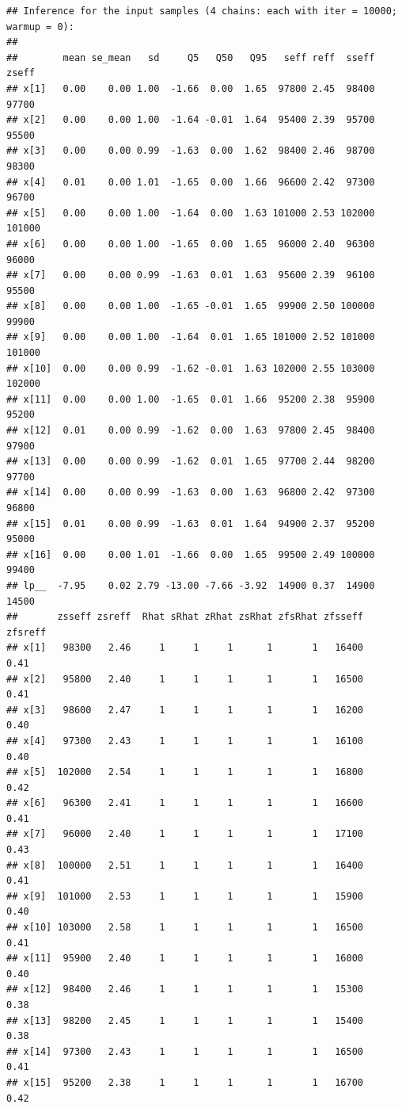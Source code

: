 \documentclass[american,]{article}
\begin{document}
\begin{verbatim}
## Inference for the input samples (4 chains: each with iter = 10000; warmup = 0):
## 
##        mean se_mean   sd     Q5   Q50   Q95   seff reff  sseff  zseff
## x[1]   0.00    0.00 1.00  -1.66  0.00  1.65  97800 2.45  98400  97700
## x[2]   0.00    0.00 1.00  -1.64 -0.01  1.64  95400 2.39  95700  95500
## x[3]   0.00    0.00 0.99  -1.63  0.00  1.62  98400 2.46  98700  98300
## x[4]   0.01    0.00 1.01  -1.65  0.00  1.66  96600 2.42  97300  96700
## x[5]   0.00    0.00 1.00  -1.64  0.00  1.63 101000 2.53 102000 101000
## x[6]   0.00    0.00 1.00  -1.65  0.00  1.65  96000 2.40  96300  96000
## x[7]   0.00    0.00 0.99  -1.63  0.01  1.63  95600 2.39  96100  95500
## x[8]   0.00    0.00 1.00  -1.65 -0.01  1.65  99900 2.50 100000  99900
## x[9]   0.00    0.00 1.00  -1.64  0.01  1.65 101000 2.52 101000 101000
## x[10]  0.00    0.00 0.99  -1.62 -0.01  1.63 102000 2.55 103000 102000
## x[11]  0.00    0.00 1.00  -1.65  0.01  1.66  95200 2.38  95900  95200
## x[12]  0.01    0.00 0.99  -1.62  0.00  1.63  97800 2.45  98400  97900
## x[13]  0.00    0.00 0.99  -1.62  0.01  1.65  97700 2.44  98200  97700
## x[14]  0.00    0.00 0.99  -1.63  0.00  1.63  96800 2.42  97300  96800
## x[15]  0.01    0.00 0.99  -1.63  0.01  1.64  94900 2.37  95200  95000
## x[16]  0.00    0.00 1.01  -1.66  0.00  1.65  99500 2.49 100000  99400
## lp__  -7.95    0.02 2.79 -13.00 -7.66 -3.92  14900 0.37  14900  14500
##       zsseff zsreff  Rhat sRhat zRhat zsRhat zfsRhat zfsseff zfsreff
## x[1]   98300   2.46     1     1     1      1       1   16400    0.41
## x[2]   95800   2.40     1     1     1      1       1   16500    0.41
## x[3]   98600   2.47     1     1     1      1       1   16200    0.40
## x[4]   97300   2.43     1     1     1      1       1   16100    0.40
## x[5]  102000   2.54     1     1     1      1       1   16800    0.42
## x[6]   96300   2.41     1     1     1      1       1   16600    0.41
## x[7]   96000   2.40     1     1     1      1       1   17100    0.43
## x[8]  100000   2.51     1     1     1      1       1   16400    0.41
## x[9]  101000   2.53     1     1     1      1       1   15900    0.40
## x[10] 103000   2.58     1     1     1      1       1   16500    0.41
## x[11]  95900   2.40     1     1     1      1       1   16000    0.40
## x[12]  98400   2.46     1     1     1      1       1   15300    0.38
## x[13]  98200   2.45     1     1     1      1       1   15400    0.38
## x[14]  97300   2.43     1     1     1      1       1   16500    0.41
## x[15]  95200   2.38     1     1     1      1       1   16700    0.42

\end{verbatim}
\end{document}
